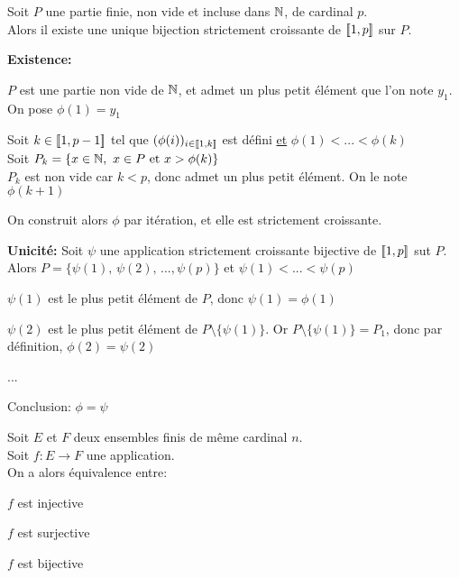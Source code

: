 \documentclass[12pt,twoside,a4paper]{article}
\begin{document}
	\begin{prop}
		Soit $P$ une partie finie, non vide et incluse dans $\mathbb{N}$, de cardinal $p$.\\
		Alors il existe une unique bijection strictement croissante de $[\![ 1,p]\!]$ sur $P$.
	\end{prop}
	\begin{preuve}
		\begin{flushleft}
			\textbf{Existence:}
			\begin{liste}
				\item $P$ est une partie non vide de $\mathbb{N}$, et admet un plus petit \'el\'ement que l'on note $y_1$.\\
					On pose $\phi(1)=y_1$
				\item Soit $k\in [\![ 1,p-1]\!]$ tel que $(\phi(i))_{i\in[\![ 1,k]\!]}$ est d\'efini \underline{et} $\phi(1)<...<\phi(k)$\\
					Soit $P_k=\{ x\in\mathbb{N},\ x\in P\text{ et } x>\phi(k) \}$\\
					$P_k$ est non vide car $k<p$, donc admet un plus petit \'el\'ement. On le note $\phi(k+1)$
			\end{liste}
			On construit alors $\phi$ par it\'eration, et elle est strictement croissante.
		\end{flushleft}
		\begin{flushleft}
			\textbf{Unicit\'e:}
			Soit $\psi$ une application strictement croissante bijective de $[\![ 1,p]\!]$ sut $P$.\\
			Alors $P=\{\psi(1),\,\psi(2),\,...,\psi(p) \}$ et $\psi(1)<...<\psi(p)$\\
			\begin{liste}
				\item$\psi(1)$ est le plus petit \'el\'ement de $P$, donc $\psi(1)=\phi(1)$
				\item$\psi(2)$ est le plus petit \'el\'ement de $P\setminus\{\psi(1) \}$. Or $P\setminus\{\psi(1) \}=P_1$, donc par d\'efinition, $\phi(2)=\psi(2)$		
				\item ...
			\end{liste}
			Conclusion: $\phi=\psi$
		\end{flushleft}
	\end{preuve}
	\begin{prop}
		Soit $E$ et $F$ deux ensembles finis de m\^eme cardinal $n$.\\
		Soit $f:E\longrightarrow F$ une application.\\
		On a alors \'equivalence entre:
		\begin{liste}
			\item[\cercle1] $f$ est injective
			\item[\cercle2] $f$ est surjective
			\item[\cercle3] $f$ est bijective
		\end{liste}
	\end{prop}
\end{document}
